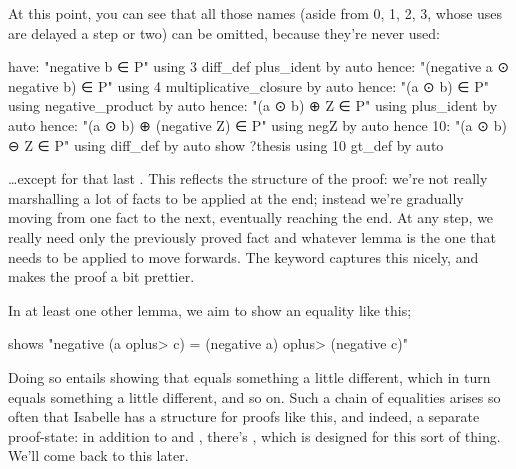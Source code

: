 At this point, you can see that all those names (aside from 0, 1, 2, 3, whose uses are delayed a step or two) can be omitted, because they're never used:
\begin{IS}
  have: "negative b ∈ P" using 3 diff_def plus_ident by auto
  hence: "(negative a  ⊙  negative b) ∈ P"  using 4  multiplicative_closure  by auto
  hence:  "(a  ⊙  b) ∈ P" using negative_product by auto
  hence:  "(a  ⊙  b) ⊕ Z ∈ P" using plus_ident by auto
  hence:  "(a  ⊙  b) ⊕ (negative Z) ∈ P" using negZ by auto
  hence 10:  "(a  ⊙  b)  ⊖  Z ∈ P" using diff_def by auto
  show ?thesis using 10 gt_def by auto 
\end{IS}

\ldots except for that last . This reflects the structure of the proof: we're not really marshalling a lot of facts to be applied at the end; instead we're gradually moving from one fact to the next, eventually reaching the end. At any step, we really need only the previously proved fact and whatever lemma is the one that needs to be applied to move forwards. The keyword  captures this nicely, and makes the proof a bit prettier. 

In at least one other lemma, we aim to show an equality like this;

\begin{IS}
  shows "negative (a  \<oplus> c) = (negative a)  \<oplus> (negative c)"
\end{IS}

Doing so entails showing that  equals something a little different, which in turn equals something a little different, and so on. Such a chain of equalities arises so often that Isabelle has a structure for proofs like this, and indeed, a separate proof-state: in addition to  and , there's , which is designed for this sort of thing. We'll come back to this later. 

